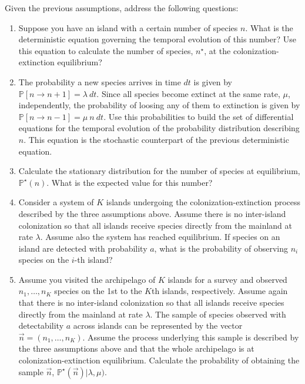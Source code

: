 \documentclass[11pt]{article}
\newcommand{\Pb}{{\mathbb P}}
\begin{document}
Given the previous assumptions, address the following questions:
\begin{enumerate}
\item Suppose you have an island with a certain number of species $n$. What is the deterministic equation governing the temporal evolution of this number? Use this equation to calculate the number of species, $n^{\star}$, at the colonization-extinction equilibrium? 

\item The probability a new species arrives in time $dt$ is given by $\Pb[n \rightarrow n+1] = \lambda\ dt$. Since all species become extinct at the same rate, $\mu$, independently, the probability of loosing any of them to extinction is given by $\Pb[n \rightarrow n -1] = \mu\ n\ dt$. Use this probabilities to build the set of differential equations for the temporal evolution of the probability distribution describing $n$. This equation is the stochastic counterpart of the previous deterministic equation. 

\item Calculate the stationary distribution for the number of species at equilibrium, $\Pb^{\star}(n)$. What is the expected value for this number?

\item Consider a system of $K$ islands undergoing the colonization-extinction process described by the three assumptions above.  Assume there is no inter-island colonization so that all islands receive species directly from the mainland at rate $\lambda$. Assume also the system has reached equilibrium. If species on an island are detected with probability $a$, what is the probability of observing $n_i$ species on the $i$-th island? 

\item Assume you visited the archipelago of $K$ islands for a survey and observed $n_1, \dots, n_K$ species on the 1st to the $K$th islands, respectively. Assume again that there is no inter-island colonization so that all islands receive species directly from the mainland at rate $\lambda$. The sample of species observed with detectability $a$ across islands can be represented by the vector $\vec{n} = (n_1, \dots, n_K)$. Assume the process underlying this sample is described by the three assumptions above and that the whole archipelago is at colonization-extinction equilibrium. Calculate the probability of obtaining the sample $\vec{n}$, $\Pb^{\star}(\vec{n}) | \lambda, \mu)$. 


\end{enumerate}
\end{document}
